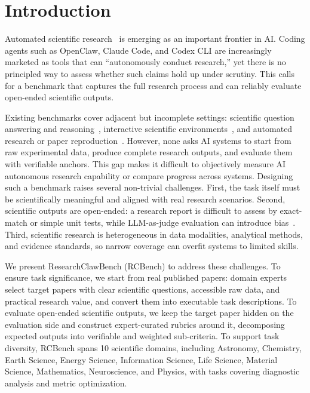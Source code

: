 \section{Introduction}
Automated scientific research~\citep{douglas2025researchers} is emerging as an important frontier in AI. Coding agents such as OpenClaw, Claude Code, and Codex CLI are increasingly marketed as tools that can ``autonomously conduct research,'' yet there is no principled way to assess whether such claims hold up under scrutiny.
This calls for a benchmark that captures the full research process and can reliably evaluate open-ended scientific outputs.

Existing benchmarks cover adjacent but incomplete settings: scientific question answering and reasoning~\citep{welbl2017crowdsourcing,rein2023gpqa}, interactive scientific environments~\citep{wang2022scienceworld,jansen2024discoveryworld}, and automated research or paper reproduction~\citep{lu2024ai,starace2025paperbench}. However, none asks AI systems to start from raw experimental data, produce complete research outputs, and evaluate them with verifiable anchors. This gap makes it difficult to objectively measure AI autonomous research capability or compare progress across systems.
Designing such a benchmark raises several non-trivial challenges. 
First, the task itself must be scientifically meaningful and aligned with real research scenarios. Second, scientific outputs are open-ended: a research report is difficult to assess by exact-match or simple unit tests, while LLM-as-judge evaluation can introduce bias~\citep{li2025generation}. Third, scientific research is heterogeneous in data modalities, analytical methods, and evidence standards, so narrow coverage can overfit systems to limited skills.

We present ResearchClawBench (RCBench) to address these challenges. To ensure task significance, we start from real published papers: domain experts select target papers with clear scientific questions, accessible raw data, and practical research value, and convert them into executable task descriptions. To evaluate open-ended scientific outputs, we keep the target paper hidden on the evaluation side and construct expert-curated rubrics around it, decomposing expected outputs into verifiable and weighted sub-criteria. To support task diversity, RCBench spans 10 scientific domains, including Astronomy, Chemistry, Earth Science, Energy Science, Information Science, Life Science, Material Science, Mathematics, Neuroscience, and Physics, with tasks covering diagnostic analysis and metric optimization.

